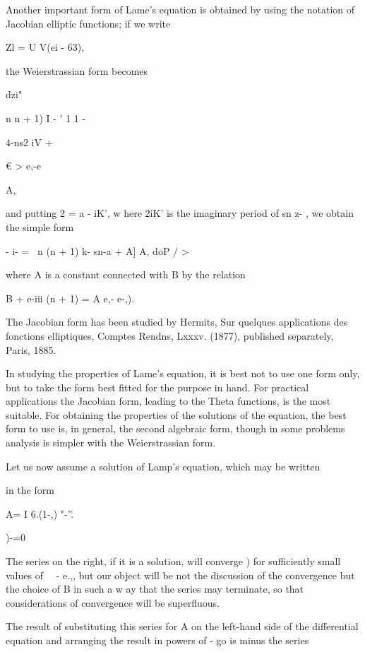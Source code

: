 {{{{Another important form of Lame's equation is obtained by using the
notation of Jacobian elliptic functions; if we write

Zl = U V(ei - 63),

the Weierstrassian form becomes

dzi"

n n + 1) I - ' 1 1 -

4-ns2 iV +

€ > e,-e

A,

and putting 2 = a - iK', w here 2iK' is the imaginary period of sn z-
, we obtain the simple form

- i- = \ n (n + 1) k- sn-a + A] A, doP / >

where A is a constant connected with B by the relation

B + e-iii (n + 1) = A e,- e-,).

The Jacobian form has been studied by Hermits, Sur quelques
applications des fonctions elliptiques, Comptes Rendns, Lxxxv. (1877),
published separately, Paris, 1885.

In studying the properties of Lame's equation, it is best not to use
one form only, but to take the form best fitted for the purpose in
hand. For practical applications the Jacobian form, leading to the
Theta functions, is the most suitable. For obtaining the properties of
the solutions of the equation, the best form to use is, in general,
the second algebraic form, though in some problems analysis is simpler
with the Weierstrassian form.

%
%


Let us now assume a solution of Lamp's equation, which may be written

in the form

A= I 6.(1-,) "-''.

)-=0

The series on the right, if it is a solution, will converge )
for sufficiently small values of \ \ - e.,, but our object will be
not the discussion of the convergence but the choice of B in such a w
ay that the series may terminate, so that considerations of
convergence will be superfluous.

The result of substituting this series for A on the left-hand side of
the differential equation and arranging the result in powers of - go
is minus the series

}}}}
